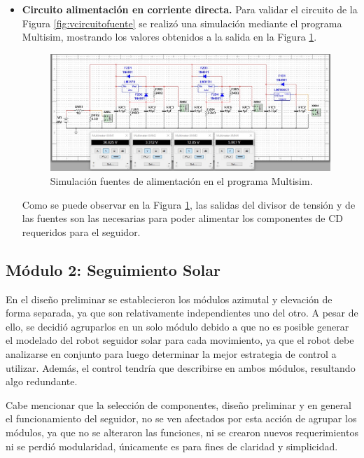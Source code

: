 \begin{itemize}
	
	\item \textbf{Circuito alimentación en corriente directa.}
	Para validar el circuito de la Figura \ref{fig:vcircuitofuente} se realizó una simulación mediante el programa Multisim, mostrando los valores obtenidos a la salida en la Figura \ref{fig:simulacionfuentes}.

\begin{figure}[H]
	\centering
	\includegraphics[width=15cm]{imagenes/Fuentes_3.jpg}
	\caption{Simulación fuentes de alimentación en el programa Multisim.}
	\label{fig:simulacionfuentes}
\end{figure}
Como se puede observar en la Figura \ref{fig:simulacionfuentes}, las salidas del divisor de tensión y de las fuentes son las necesarias para poder alimentar los componentes de CD requeridos para el seguidor.\\

\end{itemize}



\newpage
\subsection{Módulo 2: Seguimiento Solar}

En el diseño preliminar se establecieron los módulos azimutal y elevación de forma separada, ya que son relativamente independientes uno del otro. A pesar de ello, se decidió agruparlos en un solo módulo debido a que no es posible generar el modelado del robot seguidor solar para cada movimiento, ya que el robot debe analizarse en conjunto para luego determinar la mejor estrategia de control a utilizar. Además, el control tendría que describirse en ambos módulos, resultando algo redundante.

Cabe mencionar que la selección de componentes, diseño preliminar y en general el funcionamiento del seguidor, no se ven afectados por esta acción de agrupar los módulos, ya que no se alteraron las funciones, ni se crearon nuevos requerimientos ni se perdió modularidad, únicamente es para fines de claridad y simplicidad.

